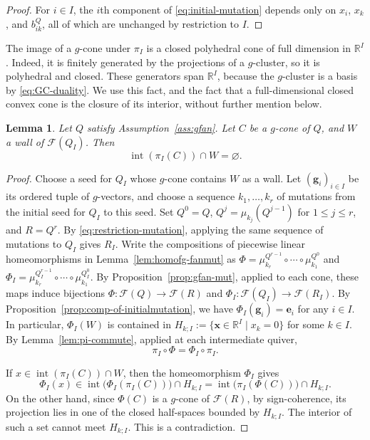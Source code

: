 \documentclass[11pt,reqno]{amsart}
\numberwithin{equation}{section}
\theoremstyle{definition}
\theoremstyle{plain}
\newtheorem{lemma}[example]{Lemma}
\renewcommand{\int}{\operatorname{int}}
\begin{document}
	\begin{proof}
		For $i\in I$, the $i$th component of \eqref{eq:initial-mutation} depends only on $x_i$, $x_k$, and $b_{ik}^Q$, all of which are unchanged by restriction to $I$.
	\end{proof}
	
	The image of a $g$-cone under $\pi_I$ is a closed polyhedral cone of full dimension in $\mathbb R^I$. Indeed, it is finitely generated by the projections of a $g$-cluster, so it is polyhedral and closed. These generators span $\mathbb R^I$, because the $g$-cluster is a basis by \eqref{eq:GC-duality}. We use this fact, and the fact that a full-dimensional closed convex cone is the closure of its interior, without further mention below.
	
	\begin{lemma}\label{lem:pi-noncross-wall}
		Let $Q$ satisfy Assumption~\ref{ass:gfan}. Let $C$ be a $g$-cone of $Q$, and $W$ a wall of $\mathcal F(Q_I)$. Then
		\[
		  \int(\pi_I(C))\cap W=\varnothing.
		\]
	\end{lemma}
	
	\begin{proof}
		Choose a seed for $Q_I$ whose $g$-cone contains $W$ as a wall. Let $(\mathbf g_i)_{i\in I}$ be its ordered tuple of $g$-vectors, and choose a sequence $k_1,\ldots,k_r$ of mutations from the initial seed for $Q_I$ to this seed. Set $Q^0=Q$, $Q^j=\mu_{k_j}(Q^{j-1})$ for $1\leq j\leq r$, and $R=Q^r$. By \eqref{eq:restriction-mutation}, applying the same sequence of mutations to $Q_I$ gives $R_I$. Write the compositions of piecewise linear homeomorphisms in Lemma~\ref{lem:homofg-fanmut} as $\Phi = \mu_{k_{r}}^{Q^{r-1}} \circ \cdots \circ \mu_{k_1}^{Q^0}$ and $\Phi_I = \mu_{k_{r}}^{Q_{I}^{r-1}} \circ \cdots \circ \mu_{k_1}^{Q_{I}^0}$. By Proposition~\ref{prop:gfan-mut}, applied to each cone, these maps induce bijections $\Phi: \mathcal{F}(Q) \to \mathcal{F}(R)$ and $\Phi_I:\mathcal{F}(Q_I) \to \mathcal{F}(R_I)$. By Proposition~\ref{prop:comp-of-initialmutation}, we have $\Phi_I(\mathbf{g}_i) = \mathbf{e}_i$ for any $i \in I$. In particular, $\Phi_I(W)$ is contained in $H_{k;I} := \{\mathbf{x} \in \mathbb{R}^I \mid x_k = 0 \}$ for some $k \in I$. By Lemma~\ref{lem:pi-commute}, applied at each intermediate quiver,
		\[
		\pi_I\circ\Phi=\Phi_I\circ\pi_I.
		\]
		
		If $x\in\int(\pi_I(C))\cap W$, then the homeomorphism $\Phi_I$ gives
		\[
		\Phi_I(x)\in\int\bigl(\Phi_I(\pi_I(C))\bigr)\cap H_{k;I}
		=\int\bigl(\pi_I(\Phi(C))\bigr)\cap H_{k;I}.
		\]
		On the other hand, since $\Phi(C)$ is a $g$-cone of $\mathcal{F}(R)$, by sign-coherence, its projection lies in one of the closed half-spaces bounded by $H_{k;I}$. The interior of such a set cannot meet $H_{k;I}$. This is a contradiction.
	\end{proof}
	
\end{document}
